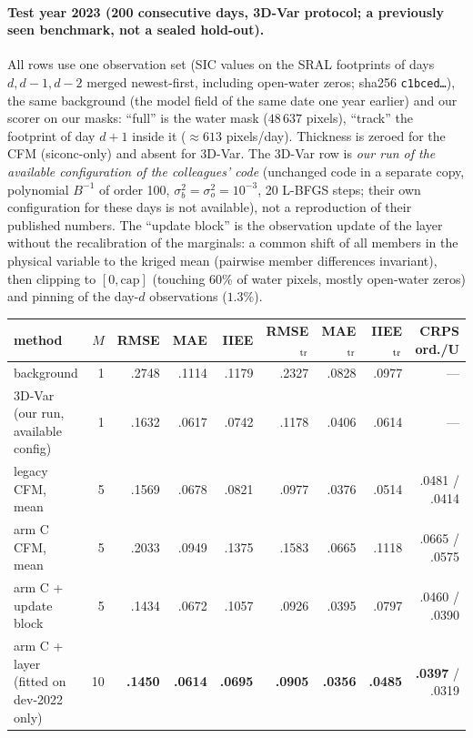 \documentclass[11pt]{article}
\begin{document}
\paragraph{Test year 2023 (200 consecutive days, 3D-Var protocol; a previously seen benchmark, not a sealed hold-out).} All rows use one observation set (SIC values on the SRAL footprints of days $d,d-1,d-2$ merged newest-first, including open-water zeros; sha256 \texttt{c1bced\ldots}), the same background (the model field of the same date one year earlier) and our scorer on our masks: ``full'' is the water mask ($48\,637$ pixels), ``track'' the footprint of day $d+1$ inside it ($\approx613$ pixels/day). Thickness is zeroed for the CFM (siconc-only) and absent for 3D-Var. The 3D-Var row is \emph{our run of the available configuration of the colleagues' code} (unchanged code in a separate copy, polynomial $B^{-1}$ of order 100, $\sigma_b^2=\sigma_o^2=10^{-3}$, 20 L-BFGS steps; their own configuration for these days is not available), not a reproduction of their published numbers. The ``update block'' is the observation update of the layer without the recalibration of the marginals: a common shift of all members in the physical variable to the kriged mean (pairwise member differences invariant), then clipping to $[0,\mathrm{cap}]$ (touching $60\%$ of water pixels, mostly open-water zeros) and pinning of the day-$d$ observations ($1.3\%$).

\begin{center}\small
\begin{tabular}{lrrrrrrrr}
\toprule
method & $M$ & RMSE & MAE & IIEE & RMSE$_{\rm tr}$ & MAE$_{\rm tr}$ & IIEE$_{\rm tr}$ & CRPS ord./U\\
\midrule
background & 1 & .2748 & .1114 & .1179 & .2327 & .0828 & .0977 & ---\\
3D-Var (our run, available config) & 1 & .1632 & .0617 & .0742 & .1178 & .0406 & .0614 & ---\\
legacy CFM, mean & 5 & .1569 & .0678 & .0821 & .0977 & .0376 & .0514 & .0481 / .0414\\
arm C CFM, mean & 5 & .2033 & .0949 & .1375 & .1583 & .0665 & .1118 & .0665 / .0575\\
arm C + update block & 5 & .1434 & .0672 & .1057 & .0926 & .0395 & .0797 & .0460 / .0390\\
arm C + layer (fitted on dev-2022 only) & 10 & \textbf{.1450} & \textbf{.0614} & \textbf{.0695} & \textbf{.0905} & \textbf{.0356} & \textbf{.0485} & \textbf{.0397} / .0319\\
\bottomrule
\end{tabular}
\end{center}
\end{document}
